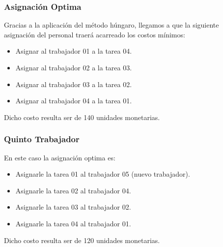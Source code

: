 
\begin{homeworkProblem}[-1][JoShop]

\subsubsection{Asignación Optima}
Gracias a la aplicación del método húngaro, llegamos a que la siguiente asignación del personal traerá acarreado los costos mínimos:
\begin{itemize}
    \item Asignar al trabajador 01 a la tarea 04.
    \item Asignar al trabajador 02 a la tarea 03.
    \item Asignar al trabajador 03 a la tarea 02.
    \item Asignar al trabajador 04 a la tarea 01.
\end{itemize}
Dicho costo resulta ser de 140 unidades monetarias.

\subsubsection{Quinto Trabajador}
En este caso la asignación optima es:
\begin{itemize}
    \item Asignarle la tarea 01 al trabajador 05 (nuevo trabajador).
    \item Asignarle la tarea 02 al trabajador 04.
    \item Asignarle la tarea 03 al trabajador 02.
    \item Asignarle la tarea 04 al trabajador 01.
\end{itemize}
Dicho costo resulta ser de 120 unidades monetarias.


\end{homeworkProblem}
